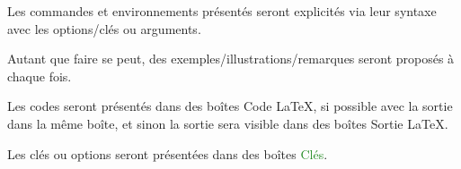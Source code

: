\documentclass[a4paper,french,11pt]{article}
\providecommand\tikzlogo{Ti\textit{k}Z}
\let\TikZ\tikzlogo
\begin{document}
\begin{codeinfo}
Les \textsf{commandes} et \textsf{environnements} présentés seront explicités via leur \textsf{syntaxe} avec les \textsf{options/clés} ou \textsf{arguments}.

Autant que faire se peut, des exemples/illustrations/remarques seront proposés à chaque fois.

\smallskip

Les \textsf{codes} seront présentés dans des \textsf{boîtes} \textcolor{red!75!black}{{\small \faCode} Code \LaTeX}, si possible avec la \textsf{sortie} dans la même boîte, et sinon la \textsf{sortie} sera visible dans des \textsf{boîtes} \textcolor{red!75!black}{{\small \faArrowAltCircleRight[regular]} Sortie \LaTeX}.

Les \textsf{clés} ou \textsf{options} seront présentées dans des \textsf{boîtes} \textcolor{ForestGreen}{{\small \faPaperclip} Clés}.
\end{codeinfo}

%
%
\end{document}
